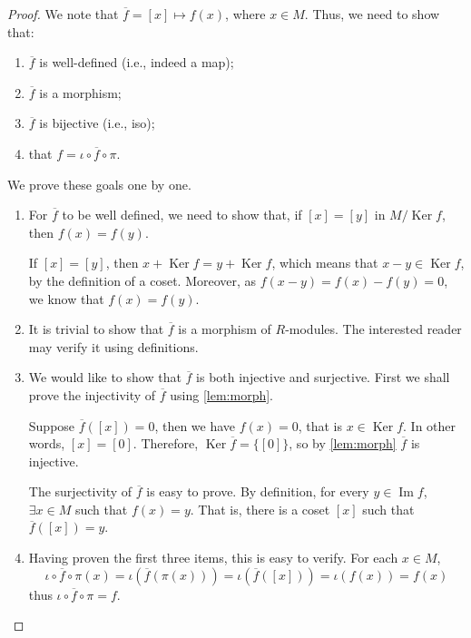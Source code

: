 \documentclass[12pt, a4paper, titlepage]{report}
\DeclareMathOperator{\Ker}{Ker}
\DeclareMathOperator{\Ima}{Im}
\begin{document}
\begin{proof}
  We note that $\overline{f} = [x] \mapsto f(x)$, where $x \in M$. Thus, we need to show that:
  \begin{enumerate}
  \item $\overline{f}$ is well-defined (i.e., indeed a map);
  \item $\overline{f}$ is a morphism;
  \item $\overline{f}$ is bijective (i.e., iso);
  \item that $f = \iota \circ \overline{f} \circ \pi$.
  \end{enumerate}

  We prove these goals one by one.

  \begin{enumerate}
  \item
    For $\overline{f}$ to be well defined, we need to show that, if $[x] = [y]$ in $M/\Ker f$, then
    $f(x) = f(y)$.

    If $[x] = [y]$, then $x + \Ker f = y + \Ker f$, which means that $x - y \in \Ker f$, by the definition of
    a coset. Moreover, as $f(x-y) = f(x) - f(y) = 0$, we know that $f(x) = f(y)$.

  \item It is trivial to show that $\overline{f}$ is a morphism of $R$-modules. The interested reader may
    verify it using definitions.

  \item
    We would like to show that $\overline{f}$ is both injective and surjective. First we shall prove the injectivity
    of $\overline{f}$ using \autoref{lem:morph}.

    Suppose $\overline{f}([x]) = 0$, then we have $f(x) = 0$, that is $x \in \Ker f$. In other words, $[x] = [0]$.
    Therefore, $\Ker \overline{f} = \{ [0] \}$, so by \autoref{lem:morph} $\overline{f}$ is injective.

    The surjectivity of $\overline{f}$ is easy to prove. By definition, for every $y \in \Ima f$, $\exists x \in M$
    such that $f(x) = y$. That is, there is a coset $[x]$ such that $\overline{f}([x]) = y$.

  \item
    Having proven the first three items, this is easy to verify. For each $x \in M$,
    \[
      \iota \circ \overline{f} \circ \pi(x) = \iota(\overline{f}(\pi(x))) = \iota(\overline{f}([x])) = \iota(f(x)) = f(x)
    \]
    thus $\iota \circ \overline{f} \circ \pi = f$.
  \end{enumerate}
\end{proof}
\end{document}
